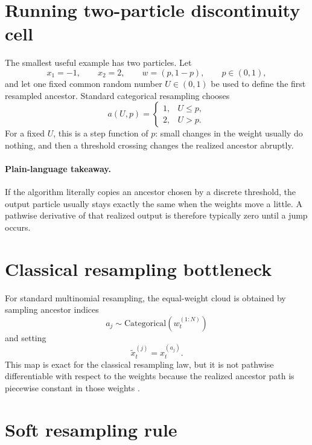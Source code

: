 \section{Running two-particle discontinuity cell}
\label{sec:bf-soft-two-particle-cell}

The smallest useful example has two particles.  Let
\[
  x_1=-1,
  \qquad
  x_2=2,
  \qquad
  w=(p,1-p),
  \qquad
  p\in(0,1),
\]
and let one fixed common random number \(U\in(0,1)\) be used to define the first
resampled ancestor.  Standard categorical resampling chooses
\begin{equation}
\label{eq:bf-soft-categorical-choice}
  a(U,p)
  =
  \begin{cases}
    1, & U\le p,\\
    2, & U>p.
  \end{cases}
\end{equation}
For a fixed \(U\), this is a step function of \(p\): small changes in the weight
usually do nothing, and then a threshold crossing changes the realized ancestor
abruptly.

\paragraph{Plain-language takeaway.}
If the algorithm literally copies an ancestor chosen by a discrete threshold, the
output particle usually stays exactly the same when the weights move a little.  A
pathwise derivative of that realized output is therefore typically zero until a
jump occurs.

\section{Classical resampling bottleneck}
\label{sec:bf-soft-bottleneck}

For standard multinomial resampling, the equal-weight cloud is obtained by
sampling ancestor indices
\[
  a_j\sim\mathrm{Categorical}(w_t^{(1:N)})
\]
and setting
\begin{equation}
\label{eq:bf-soft-hard-resample}
  \tilde x_t^{(j)} = x_t^{(a_j)}.
\end{equation}
This map is exact for the classical resampling law, but it is not pathwise
differentiable with respect to the weights because the realized ancestor path is
piecewise constant in those weights \citep{zhumurphyjonschkowski2020,jonschkowski2018differentiable}.

\section{Soft resampling rule}
\label{sec:bf-soft-rule}

